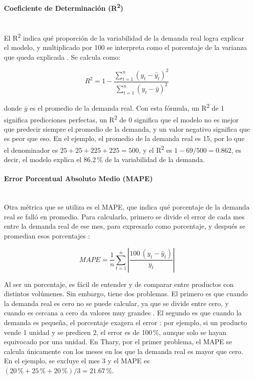 \paragraph{Coeficiente de Determinación (R\textsuperscript{2})}\mbox{}\\
El R\textsuperscript{2} indica qué proporción de la variabilidad de la demanda real logra explicar el modelo, y multiplicado por 100 se interpreta como el porcentaje de la varianza que queda explicada \cite{pelaez2016modelos}. Se calcula como:

\begin{equation}
R^2 = 1 - \frac{\sum_{t=1}^{n} (y_t - \hat{y}_t)^2}{\sum_{t=1}^{n} (y_t - \bar{y})^2}
\end{equation}

donde $\bar{y}$ es el promedio de la demanda real. Con esta fórmula, un R\textsuperscript{2} de 1 significa predicciones perfectas, un R\textsuperscript{2} de 0 significa que el modelo no es mejor que predecir siempre el promedio de la demanda, y un valor negativo significa que es peor que eso. En el ejemplo, el promedio de la demanda real es 15, por lo que el denominador es $25 + 25 + 225 + 225 = 500$, y el R\textsuperscript{2} es $1 - 69/500 = 0.862$, es decir, el modelo explica el 86.2\,\% de la variabilidad de la demanda.

\paragraph{Error Porcentual Absoluto Medio (MAPE)}\mbox{}\\
Otra métrica que se utiliza es el MAPE, que indica qué porcentaje de la demanda real se falló en promedio. Para calcularlo, primero se divide el error de cada mes entre la demanda real de ese mes, para expresarlo como porcentaje, y después se promedian esos porcentajes \cite{hewamalage2023evaluation}:

\begin{equation}
MAPE = \frac{1}{n}\sum_{t=1}^{n} \left\lvert \frac{100\,(y_t - \hat{y}_t)}{y_t} \right\rvert
\end{equation}

Al ser un porcentaje, es fácil de entender y de comparar entre productos con distintos volúmenes. Sin embargo, tiene dos problemas. El primero es que cuando la demanda real es cero no se puede calcular, ya que se divide entre cero, y cuando es cercana a cero da valores muy grandes \cite{kim2016maape}. El segundo es que cuando la demanda es pequeña, el porcentaje exagera el error \cite{hewamalage2023evaluation}: por ejemplo, si un producto vende 1 unidad y se predicen 2, el error es de 100\,\%, aunque solo se hayan equivocado por una unidad. En Thary, por el primer problema, el MAPE se calcula únicamente con los meses en los que la demanda real es mayor que cero. En el ejemplo, se excluye el mes 3 y el MAPE es $(20\,\% + 25\,\% + 20\,\%)/3 = 21.67\,\%$.

